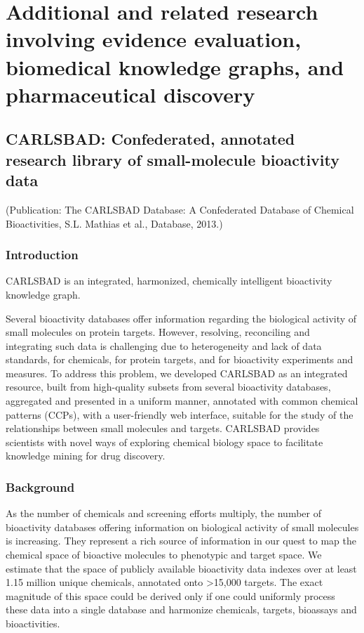 \chapter{Additional and related research involving evidence evaluation, biomedical knowledge graphs, and pharmaceutical discovery}

\section{CARLSBAD: Confederated, annotated research library of small-molecule bioactivity data}

(Publication: The CARLSBAD Database: A Confederated Database of Chemical Bioactivities, S.L. Mathias et al., Database, 2013\cite{Mathias2013-hj}.)

\subsection{Introduction}

CARLSBAD is an integrated, harmonized, chemically intelligent bioactivity knowledge graph.

Several bioactivity databases offer information regarding the biological activity of small molecules on protein targets. However, resolving, reconciling and integrating such data is challenging due to heterogeneity and lack of data standards, for chemicals, for protein targets, and for bioactivity experiments and measures. To address this problem, we developed CARLSBAD as an integrated resource, built from high-quality subsets from several bioactivity databases, aggregated and presented in a uniform manner, annotated with common chemical patterns (CCPs), with a user-friendly web interface, suitable for the study of the relationships between small molecules and targets. CARLSBAD provides scientists with novel ways of exploring chemical biology space to facilitate knowledge mining for drug discovery. 

\subsection{Background}

As the number of chemicals and screening efforts multiply, the number of bioactivity databases offering information on biological activity of small molecules is increasing. They represent a rich source of information in our quest to map the chemical space of bioactive molecules to phenotypic and target space. We estimate that the space of publicly available bioactivity data indexes over at least 1.15 million unique chemicals, annotated onto \textgreater 15,000 targets\cite{Kim_Kjaerulff2013-hi}. The exact magnitude of this space could be derived only if one could uniformly process these data into a single database and harmonize chemicals, targets, bioassays and bioactivities. 

